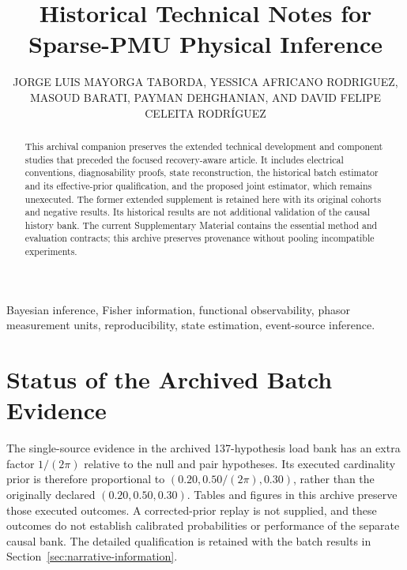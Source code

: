 \documentclass{ieeeaccess}
\begin{document}
\history{}
\doi{}
\title{Historical Technical Notes for Sparse-PMU Physical Inference}
\author{\uppercase{Jorge Luis Mayorga Taborda}, \uppercase{Yessica Africano Rodriguez}, \uppercase{Masoud Barati}, \uppercase{Payman Dehghanian}, AND \uppercase{David Felipe Celeita Rodr\'iguez}}
\address[1]{Universidad de los Andes, Bogot\'a, Colombia}
\address[2]{Department of Electrical and Computer Engineering, University of Pittsburgh, Pittsburgh, PA, USA}
\address[3]{Department of Electrical and Computer Engineering, The George Washington University, Washington, DC, USA}
\address[4]{Faculty of Engineering, Universidad de La Sabana, Ch\'ia, Colombia}

\begin{abstract}
This archival companion preserves the extended technical development and
component studies that preceded the focused recovery-aware article.
It includes electrical conventions, diagnosability proofs, state
reconstruction, the historical batch estimator and its effective-prior
qualification, and the proposed joint estimator, which remains unexecuted.
The former extended supplement is retained here with its original
cohorts and negative results. Its historical results are not additional
validation of the causal history bank. The current Supplementary Material
contains the essential method and evaluation contracts; this archive
preserves provenance without pooling incompatible experiments.
\end{abstract}
\begin{keywords}
Bayesian inference, Fisher information, functional observability, phasor measurement units, reproducibility, state estimation, event-source inference.
\end{keywords}
\titlepgskip=-21pt
\maketitle
\raggedbottom

\appendices

\section*{Status of the Archived Batch Evidence}
The single-source evidence in the archived 137-hypothesis load bank has
an extra factor $1/(2\pi)$ relative to the null and pair hypotheses. Its
executed cardinality prior is therefore proportional to
$(0.20,0.50/(2\pi),0.30)$, rather than the originally declared
$(0.20,0.50,0.30)$. Tables and figures in this archive preserve those
executed outcomes. A corrected-prior replay is not supplied, and these
outcomes do not establish calibrated probabilities or performance of the
separate causal bank. The detailed qualification is retained with the
batch results in Section~\ref{sec:narrative-information}.
\end{document}
